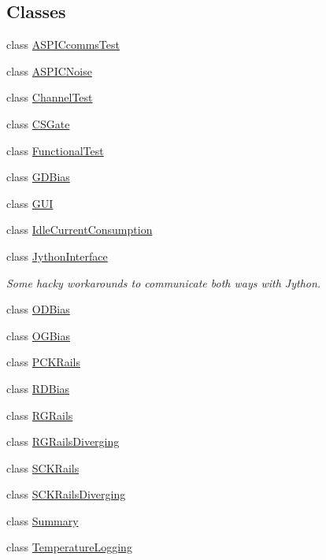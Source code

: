 \subsection*{Classes}
\begin{DoxyCompactItemize}
\item 
class \hyperlink{class_w_r_e_b_test_1_1_a_s_p_i_ccomms_test}{A\+S\+P\+I\+Ccomms\+Test}
\item 
class \hyperlink{class_w_r_e_b_test_1_1_a_s_p_i_c_noise}{A\+S\+P\+I\+C\+Noise}
\item 
class \hyperlink{class_w_r_e_b_test_1_1_channel_test}{Channel\+Test}
\item 
class \hyperlink{class_w_r_e_b_test_1_1_c_s_gate}{C\+S\+Gate}
\item 
class \hyperlink{class_w_r_e_b_test_1_1_functional_test}{Functional\+Test}
\item 
class \hyperlink{class_w_r_e_b_test_1_1_g_d_bias}{G\+D\+Bias}
\item 
class \hyperlink{class_w_r_e_b_test_1_1_g_u_i}{G\+UI}
\item 
class \hyperlink{class_w_r_e_b_test_1_1_idle_current_consumption}{Idle\+Current\+Consumption}
\item 
class \hyperlink{class_w_r_e_b_test_1_1_jython_interface}{Jython\+Interface}
\begin{DoxyCompactList}\small\item\em Some hacky workarounds to communicate both ways with Jython. \end{DoxyCompactList}\item 
class \hyperlink{class_w_r_e_b_test_1_1_o_d_bias}{O\+D\+Bias}
\item 
class \hyperlink{class_w_r_e_b_test_1_1_o_g_bias}{O\+G\+Bias}
\item 
class \hyperlink{class_w_r_e_b_test_1_1_p_c_k_rails}{P\+C\+K\+Rails}
\item 
class \hyperlink{class_w_r_e_b_test_1_1_r_d_bias}{R\+D\+Bias}
\item 
class \hyperlink{class_w_r_e_b_test_1_1_r_g_rails}{R\+G\+Rails}
\item 
class \hyperlink{class_w_r_e_b_test_1_1_r_g_rails_diverging}{R\+G\+Rails\+Diverging}
\item 
class \hyperlink{class_w_r_e_b_test_1_1_s_c_k_rails}{S\+C\+K\+Rails}
\item 
class \hyperlink{class_w_r_e_b_test_1_1_s_c_k_rails_diverging}{S\+C\+K\+Rails\+Diverging}
\item 
class \hyperlink{class_w_r_e_b_test_1_1_summary}{Summary}
\item 
class \hyperlink{class_w_r_e_b_test_1_1_temperature_logging}{Temperature\+Logging}
\end{DoxyCompactItemize}
